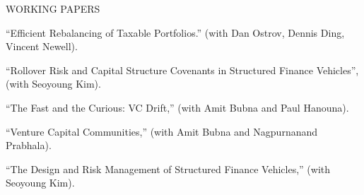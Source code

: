 \documentclass{article}
\begin{document}




\begin{description}
\item[WORKING PAPERS] \mbox{}
\end{description}

\begin{etaremune}
\setlength\itemsep{-0.3em}






\item ``Efficient Rebalancing of Taxable Portfolios.'' (with Dan Ostrov, Dennis Ding, Vincent Newell). 

\item ``Rollover Risk and Capital Structure Covenants in Structured Finance Vehicles'', (with Seoyoung Kim).



\item ``The Fast and the Curious: VC Drift,'' (with Amit Bubna and Paul Hanouna). 


\item ``Venture Capital Communities,'' (with Amit Bubna and Nagpurnanand Prabhala). 

\item ``The Design and Risk Management of Structured Finance Vehicles,'' (with Seoyoung Kim).







\end{etaremune}
\end{document}
